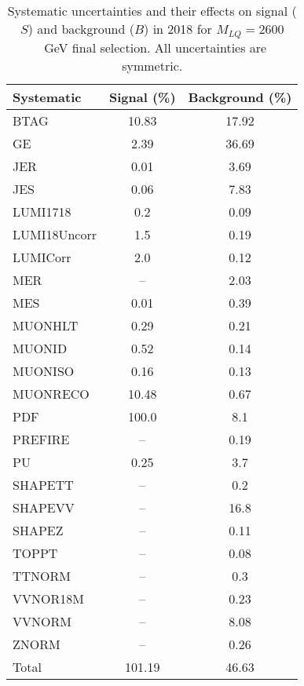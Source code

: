 \begin{table}[htbp]
\begin{center}
\caption{Systematic uncertainties and their effects on signal ($S$) and background ($B$) in 2018 for $M_{LQ}=2600$~GeV final selection. All uncertainties are symmetric.}
\begin{tabular}{lcc}
\hline\hline
Systematic & Signal (\%) & Background (\%) \\ \hline 
BTAG & 10.83 & 17.92\\ 
GE & 2.39 & 36.69\\ 
JER & 0.01 & 3.69\\ 
JES & 0.06 & 7.83\\ 
LUMI1718 & 0.2 & 0.09\\ 
LUMI18Uncorr & 1.5 & 0.19\\ 
LUMICorr & 2.0 & 0.12\\ 
MER & -- & 2.03\\ 
MES & 0.01 & 0.39\\ 
MUONHLT & 0.29 & 0.21\\ 
MUONID & 0.52 & 0.14\\ 
MUONISO & 0.16 & 0.13\\ 
MUONRECO & 10.48 & 0.67\\ 
PDF & 100.0 & 8.1\\ 
PREFIRE & -- & 0.19\\ 
PU & 0.25 & 3.7\\ 
SHAPETT & -- & 0.2\\ 
SHAPEVV & -- & 16.8\\ 
SHAPEZ & -- & 0.11\\ 
TOPPT & -- & 0.08\\ 
TTNORM & -- & 0.3\\ 
VVNOR18M & -- & 0.23\\ 
VVNORM & -- & 8.08\\ 
ZNORM & -- & 0.26\\ 
Total & 101.19 & 46.63\\ \hline \hline
\end{tabular}
\label{tab:SysUncertainties_uujj_2600}
\end{center}
\end{table}

